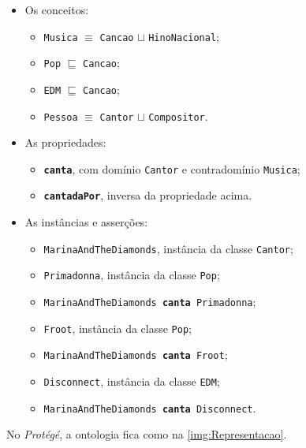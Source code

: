 \begin{itemize}
	\item Os conceitos: 
	\begin{itemize}
		\item \texttt{Musica} $ \equiv $ \texttt{Cancao} $ \sqcup $ \texttt{HinoNacional};
		\item \texttt{Pop} $ \sqsubseteq $ \texttt{Cancao};
		\item \texttt{EDM} $ \sqsubseteq $ \texttt{Cancao};
		\item \texttt{Pessoa} $ \equiv $ \texttt{Cantor} $ \sqcup $ \texttt{Compositor}.
	\end{itemize}
	\item As propriedades:
	\begin{itemize}
		\item \textbf{\texttt{canta}}, com domínio \texttt{Cantor} e contradomínio \texttt{Musica};
		\item \textbf{\texttt{cantadaPor}}, inversa da propriedade acima.
	\end{itemize}
	\item As instâncias e asserções:
	\begin{itemize}
		\item \texttt{MarinaAndTheDiamonds}, instância da classe \texttt{Cantor};
		\item \texttt{Primadonna}, instância da classe \texttt{Pop};
		\item \texttt{MarinaAndTheDiamonds \textbf{canta} Primadonna};
		\item \texttt{Froot}, instância da classe \texttt{Pop};
		\item \texttt{MarinaAndTheDiamonds \textbf{canta} Froot};
		\item \texttt{Disconnect}, instância da classe \texttt{EDM};
		\item \texttt{MarinaAndTheDiamonds \textbf{canta} Disconnect}.	
	\end{itemize}
\end{itemize}

No \textit{Protégé}, a ontologia fica como na \autoref{img:Representacao}.

